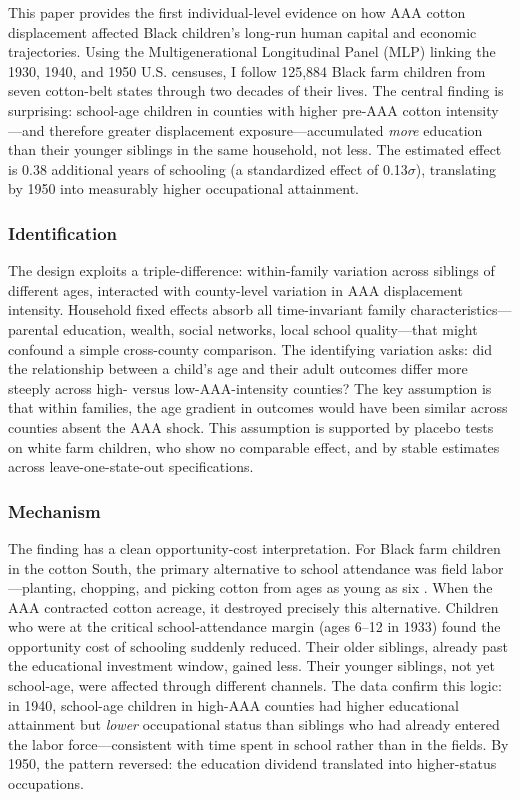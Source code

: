 \documentclass[12pt]{article}
\begin{document}
This paper provides the first individual-level evidence on how AAA cotton displacement affected Black children's long-run human capital and economic trajectories. Using the Multigenerational Longitudinal Panel (MLP) linking the 1930, 1940, and 1950 U.S. censuses, I follow 125,884 Black farm children from seven cotton-belt states through two decades of their lives. The central finding is surprising: school-age children in counties with higher pre-AAA cotton intensity---and therefore greater displacement exposure---accumulated \textit{more} education than their younger siblings in the same household, not less. The estimated effect is 0.38 additional years of schooling (a standardized effect of 0.13$\sigma$), translating by 1950 into measurably higher occupational attainment.

\subsubsection*{Identification} The design exploits a triple-difference: within-family variation across siblings of different ages, interacted with county-level variation in AAA displacement intensity. Household fixed effects absorb all time-invariant family characteristics---parental education, wealth, social networks, local school quality---that might confound a simple cross-county comparison. The identifying variation asks: did the relationship between a child's age and their adult outcomes differ more steeply across high- versus low-AAA-intensity counties? The key assumption is that within families, the age gradient in outcomes would have been similar across counties absent the AAA shock. This assumption is supported by placebo tests on white farm children, who show no comparable effect, and by stable estimates across leave-one-state-out specifications.

\subsubsection*{Mechanism} The finding has a clean opportunity-cost interpretation. For Black farm children in the cotton South, the primary alternative to school attendance was field labor---planting, chopping, and picking cotton from ages as young as six \citep{wright1986old}. When the AAA contracted cotton acreage, it destroyed precisely this alternative. Children who were at the critical school-attendance margin (ages 6--12 in 1933) found the opportunity cost of schooling suddenly reduced. Their older siblings, already past the educational investment window, gained less. Their younger siblings, not yet school-age, were affected through different channels. The data confirm this logic: in 1940, school-age children in high-AAA counties had higher educational attainment but \textit{lower} occupational status than siblings who had already entered the labor force---consistent with time spent in school rather than in the fields. By 1950, the pattern reversed: the education dividend translated into higher-status occupations.
\end{document}
